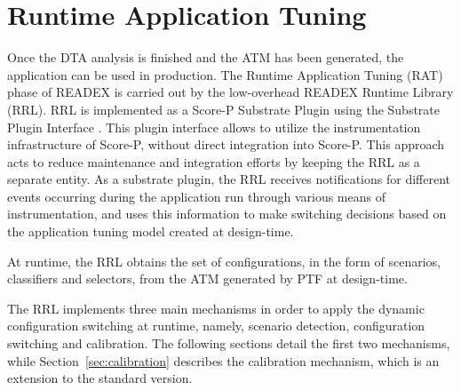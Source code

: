 \section{Runtime Application Tuning} \label{rat}

Once the DTA analysis is finished and the ATM has been generated, the application can be used in production. The Runtime Application Tuning (RAT) phase of READEX is carried out by the low-overhead READEX Runtime Library (RRL). RRL is implemented as a Score-P Substrate Plugin using the Substrate Plugin Interface \cite{Schoene2017}. This plugin interface allows to utilize the instrumentation infrastructure of Score-P, without direct integration into Score-P. This approach acts to reduce maintenance and integration efforts by keeping the RRL as a separate entity. As a substrate plugin, the RRL receives notifications for different events occurring during the application run through various means of instrumentation, and uses this information to make switching decisions based on the application tuning model created at design-time.

At runtime, the RRL obtains the set of configurations, in the form of scenarios, classifiers and selectors, from the ATM generated by PTF at design-time.

The RRL implements three main mechanisms in order to apply the dynamic configuration switching at runtime, namely, scenario detection, configuration switching and calibration. The following sections detail the first two mechanisms, while Section~\ref{sec:calibration} describes the calibration mechanism, which is an extension to the standard version.


